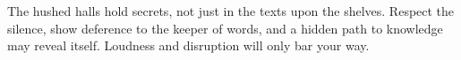 \documentclass{article}
\begin{document}
\begin{infobox}
The hushed halls hold secrets, not just in the texts upon the shelves. Respect the silence, show deference to the keeper of words, and a hidden path to knowledge may reveal itself. Loudness and disruption will only bar your way.
\end{infobox}
\end{document}
